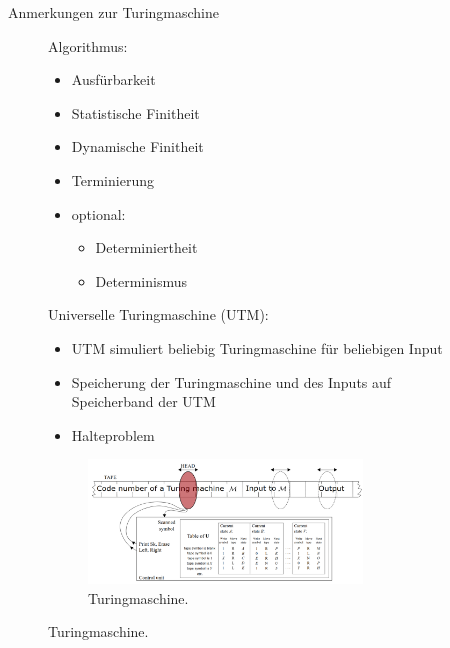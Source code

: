 \documentclass[aspectratio=1610, 9pt]{beamer}
\begin{document}
\begin{frame}{Anmerkungen zur Turingmaschine}
  \begin{figure}
    \begin{minipage}{0.29\textwidth}
      Algorithmus:
      \begin{itemize}
        \item Ausfürbarkeit
        \item Statistische Finitheit
        \item Dynamische Finitheit
        \item Terminierung
        \item optional:
        \begin{itemize}
          \item[\bullet] Determiniertheit
          \item[\bullet] Determinismus
        \end{itemize}
      \end{itemize}
    \end{minipage}
    \hfill
    \begin{minipage}{0.69\textwidth}
      Universelle Turingmaschine (UTM):
      \begin{itemize}
        \item UTM simuliert beliebig Turingmaschine für beliebigen Input
        \item Speicherung der Turingmaschine und des Inputs auf Speicherband der UTM
        \item[\rightarrow] Halteproblem
      \end{itemize}
      \begin{figure}
        \includegraphics[width=0.8\textwidth]{images/UTM.png}
        \caption{Turingmaschine.}
      \end{figure}
    \end{minipage}
  \end{figure}
\end{frame}
\end{document}
